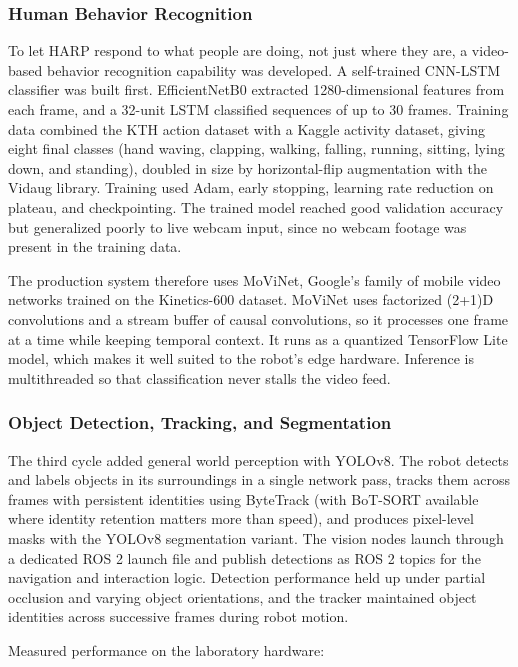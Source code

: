 \documentclass[11pt,a4paper]{article}
\begin{document}
\subsubsection{Human Behavior Recognition}

To let HARP respond to what people are doing, not just where they are, a video-based behavior recognition capability was developed. A self-trained CNN-LSTM classifier was built first. EfficientNetB0 extracted 1280-dimensional features from each frame, and a 32-unit LSTM classified sequences of up to 30 frames. Training data combined the KTH action dataset with a Kaggle activity dataset, giving eight final classes (hand waving, clapping, walking, falling, running, sitting, lying down, and standing), doubled in size by horizontal-flip augmentation with the Vidaug library. Training used Adam, early stopping, learning rate reduction on plateau, and checkpointing. The trained model reached good validation accuracy but generalized poorly to live webcam input, since no webcam footage was present in the training data.

The production system therefore uses MoViNet, Google's family of mobile video networks trained on the Kinetics-600 dataset. MoViNet uses factorized (2+1)D convolutions and a stream buffer of causal convolutions, so it processes one frame at a time while keeping temporal context. It runs as a quantized TensorFlow Lite model, which makes it well suited to the robot's edge hardware. Inference is multithreaded so that classification never stalls the video feed.

\subsubsection{Object Detection, Tracking, and Segmentation}

The third cycle added general world perception with YOLOv8. The robot detects and labels objects in its surroundings in a single network pass, tracks them across frames with persistent identities using ByteTrack (with BoT-SORT available where identity retention matters more than speed), and produces pixel-level masks with the YOLOv8 segmentation variant. The vision nodes launch through a dedicated ROS 2 launch file and publish detections as ROS 2 topics for the navigation and interaction logic. Detection performance held up under partial occlusion and varying object orientations, and the tracker maintained object identities across successive frames during robot motion.

Measured performance on the laboratory hardware:
\end{document}
